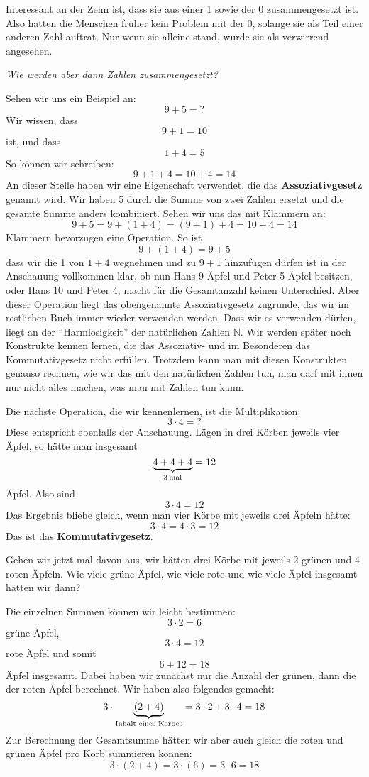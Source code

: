 Interessant an der Zehn ist, dass sie aus einer 1 sowie der 0 zusammengesetzt ist. Also hatten die Menschen früher kein Problem mit der 0, solange sie als Teil einer anderen Zahl auftrat. Nur wenn sie alleine stand, wurde sie als verwirrend angesehen.

\noindent \textsl{Wie werden aber dann Zahlen zusammengesetzt?}

\noindent Sehen wir uns ein Beispiel an:
\[9+5 = ?\]
Wir wissen, dass 
\[9+1 = 10\]
ist, und dass
\[1+4 = 5\]
So können wir schreiben:
\[9+1+4 = 10 + 4 = 14\]
An dieser Stelle haben wir eine Eigenschaft verwendet, die das \textbf{Assoziativgesetz} genannt wird. Wir haben 5 durch die Summe von zwei Zahlen ersetzt und die gesamte Summe anders kombiniert. Sehen wir uns das mit Klammern an:
\[9+5 = 9+(1+4) = (9+1)+4 = 10+4 = 14\]
Klammern bevorzugen eine Operation. So ist
\[9+(1+4)=9+5\]
dass wir die 1 von $1+4$ wegnehmen und zu $9+1$ hinzufügen dürfen ist in der Anschauung vollkommen klar, ob nun Hans 9 Äpfel und Peter 5 Äpfel besitzen, oder Hans 10 und Peter 4, macht für die Gesamtanzahl keinen Unterschied. Aber dieser Operation liegt das obengenannte Assoziativgesetz zugrunde, das wir im restlichen Buch immer wieder verwenden werden. Dass wir es verwenden dürfen, liegt an der "`Harmlosigkeit"' der natürlichen Zahlen $\mathbb{N}$. Wir werden später noch Konstrukte kennen lernen, die das Assoziativ- und im Besonderen das Kommutativgesetz nicht erfüllen. Trotzdem kann man mit diesen Konstrukten genauso rechnen, wie wir das mit den natürlichen Zahlen tun, man darf mit ihnen nur nicht alles machen, was man mit Zahlen tun kann.

Die nächste Operation, die wir kennenlernen, ist die Multiplikation:
\[3\cdot 4 = ?\]
Diese entspricht ebenfalls der Anschauung. Lägen in drei Körben jeweils vier Äpfel, so hätte man insgesamt
\[\underbrace{4+4+4}_{3 \, \textnormal{mal}} = 12\]
Äpfel. Also sind 
\[3\cdot 4 = 12\]
Das Ergebnis bliebe gleich, wenn man vier Körbe mit jeweils drei Äpfeln hätte:
\[3\cdot 4 = 4\cdot 3 = 12\]
Das ist das \textbf{Kommutativgesetz}.

Gehen wir jetzt mal davon aus, wir hätten drei Körbe mit jeweils 2 grünen und 4 roten Äpfeln. Wie viele grüne Äpfel, wie viele rote und wie viele Äpfel insgesamt hätten wir dann?

Die einzelnen Summen können wir leicht bestimmen: 
\[3\cdot 2 = 6\]
grüne Äpfel,
\[3\cdot 4 = 12 \]
rote Äpfel und somit
\[6+12 = 18\]
Äpfel insgesamt. Dabei haben wir zunächst nur die Anzahl der grünen, dann die der roten Äpfel berechnet. Wir haben also folgendes gemacht:
\[3\cdot \underbrace{(2+4)}_{\textnormal{Inhalt eines Korbes}} = 3\cdot 2 + 3\cdot 4 = 18\]
Zur Berechnung der Gesamtsumme hätten wir aber auch gleich die roten und grünen Äpfel pro Korb summieren können:
\[3\cdot (2+4) = 3\cdot (6) = 3\cdot 6 = 18 \]

